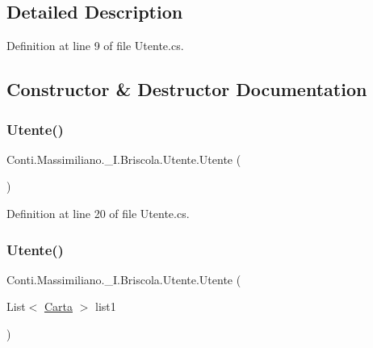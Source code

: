 \subsection{Detailed Description}


Definition at line 9 of file Utente.\+cs.



\subsection{Constructor \& Destructor Documentation}
\hypertarget{class_conti_1_1_massimiliano_1_1__5_i_1_1_briscola_1_1_utente_ac9e26e74a26c939616f77a2ae5671fb7}{}\label{class_conti_1_1_massimiliano_1_1__5_i_1_1_briscola_1_1_utente_ac9e26e74a26c939616f77a2ae5671fb7} 
\subsubsection{\texorpdfstring{Utente()}{Utente()}\hspace{0.1cm}{\footnotesize\ttfamily [1/2]}}
{\footnotesize\ttfamily Conti.\+Massimiliano.\+\_\+I.\+Briscola.\+Utente.\+Utente (\begin{DoxyParamCaption}{ }\end{DoxyParamCaption})}



Definition at line 20 of file Utente.\+cs.

\hypertarget{class_conti_1_1_massimiliano_1_1__5_i_1_1_briscola_1_1_utente_a829e50ab065199b4661dfe4577835515}{}\label{class_conti_1_1_massimiliano_1_1__5_i_1_1_briscola_1_1_utente_a829e50ab065199b4661dfe4577835515} 
\subsubsection{\texorpdfstring{Utente()}{Utente()}\hspace{0.1cm}{\footnotesize\ttfamily [2/2]}}
{\footnotesize\ttfamily Conti.\+Massimiliano.\+\_\+I.\+Briscola.\+Utente.\+Utente (\begin{DoxyParamCaption}\item[{List$<$ \hyperlink{class_conti_1_1_massimiliano_1_1__5_i_1_1_briscola_1_1_carta}{Carta} $>$}]{list1 }\end{DoxyParamCaption})}



